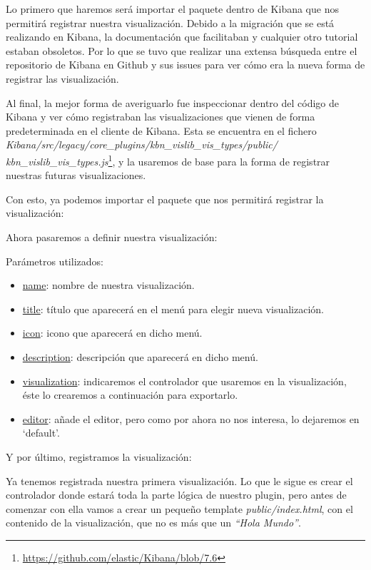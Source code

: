\documentclass[a4paper, 12pt]{book}
\begin{document}
Lo primero que haremos será importar el paquete dentro de Kibana que nos permitirá registrar nuestra visualización. Debido a la migración que se está realizando en Kibana, la documentación que facilitaban y cualquier otro tutorial estaban obsoletos. Por lo que se tuvo que realizar una extensa búsqueda entre el repositorio de Kibana en Github y sus issues para ver cómo era la nueva forma de registrar las visualización. 

Al final, la mejor forma de averiguarlo fue inspeccionar dentro del código de Kibana y ver cómo registraban las visualizaciones que vienen de forma predeterminada en el cliente de Kibana. Esta se encuentra en el fichero \textit{Kibana/src/legacy/core\_plugins/kbn\_vislib\_vis\_types/public/
kbn\_vislib\_vis\_types.js}\footnote{\url{https://github.com/elastic/Kibana/blob/7.6}}, y la usaremos de base para la forma de registrar nuestras futuras visualizaciones.

Con esto, ya podemos importar el paquete que nos permitirá registrar la visualización:



Ahora pasaremos a definir nuestra visualización:


Parámetros utilizados:
\begin{itemize}
    \item \underline{name}: nombre de nuestra visualización.
    \item \underline{title}: título que aparecerá en el menú para elegir nueva visualización.
    \item \underline{icon}: icono que aparecerá en dicho menú.
    \item \underline{description}:  descripción que aparecerá en dicho menú.
    \item \underline{visualization}: indicaremos el controlador que usaremos en la visualización, éste lo crearemos a continuación para exportarlo.
    \item \underline{editor}: añade el editor, pero como por ahora no nos interesa, lo dejaremos en ‘default’.
\end{itemize}

Y por último, registramos la visualización:



Ya tenemos registrada nuestra primera visualización. Lo que le sigue es crear el controlador donde estará toda la parte lógica de nuestro plugin, pero antes de comenzar con ella vamos a crear un pequeño template \textit{public/index.html}, con el contenido de la visualización, que no es más que un \textit{“Hola Mundo”}.
\end{document}
